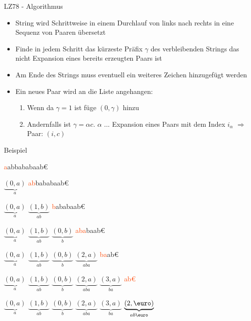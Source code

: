 \begin{frame}{\FrameName}
\begin{block}{LZ78 - Algorithmus}
	\begin{itemize}[<+->]
		\item String wird Schrittweise in einem Durchlauf von links nach rechts in eine Sequenz von Paaren übersetzt
		\item Finde in jedem Schritt das kürzeste Präfix $\gamma$ des verbleibenden Strings das nicht Expansion eines bereits erzeugten Paars ist
		\item Am Ende des Strings muss eventuell ein weiteres Zeichen hinzugefügt werden
		\item Ein neues Paar wird an die Liste angehangen:
		\begin{enumerate}
			\item<4-> Wenn da $\gamma = 1$ ist füge $(0,\gamma)$ hinzu
			\item<5-> Andernfalls ist $\gamma = \alpha c$. \linebreak $\alpha$ ... Expansion eines Paars mit dem Index $i_\alpha$ \linebreak $\Rightarrow$ Paar: $(i,c)$
		\end{enumerate}
	\end{itemize}
\end{block}
\end{frame}

\newcommand{\M}[1]{\textcolor{OrangeRed}{#1}}

\begin{frame}{\FrameName}
\begin{block}{Beispiel}
	\begin{description}[<+->]
		\item \M{a}abbababaab\euro
		\item $\underbrace{(0,a)}_{a}$ \M{ab}bababaab\euro
		\item $\underbrace{(0,a)}_{a}$ $\underbrace{(1,b)}_{ab}$ \M{b}ababaab\euro
		\item $\underbrace{(0,a)}_{a}$ $\underbrace{(1,b)}_{ab}$ $\underbrace{(0,b)}_{b}$ \M{aba}baab\euro
		\item $\underbrace{(0,a)}_{a}$ $\underbrace{(1,b)}_{ab}$ $\underbrace{(0,b)}_{b}$ $\underbrace{(2,a)}_{aba}$ \M{ba}ab\euro
		\item $\underbrace{(0,a)}_{a}$ $\underbrace{(1,b)}_{ab}$ $\underbrace{(0,b)}_{b}$ $\underbrace{(2,a)}_{aba}$ $\underbrace{(3,a)}_{ba}$ \M{ab\euro}
		\item $\underbrace{(0,a)}_{a}$ $\underbrace{(1,b)}_{ab}$ $\underbrace{(0,b)}_{b}$ $\underbrace{(2,a)}_{aba}$ $\underbrace{(3,a)}_{ba}$ $\underbrace{(2,\text{\euro})}_{ab\text{\euro}}$
	\end{description}
\end{block}
\end{frame}

